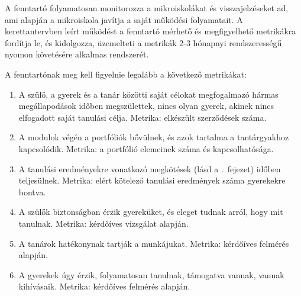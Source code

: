 A fenntartó folyamatosan monitorozza a mikroiskolákat és visszajelzéseket ad,
ami alapján a mikroiskola javítja a saját működési folyamatait. A kerettantervben leírt működést a
fenntartó mérhető és megfigyelhető metrikákra fordítja le, és kidolgozza,
üzemelteti a metrikák 2-3 hónapnyi rendszerességű nyomon követésére alkalmas
rendszerét.

A fenntartónak meg kell figyelnie legalább a következő metrikákat:
\begin{enumerate}
      \item A szülő, a gyerek és a tanár közötti saját célokat megfogalmazó
            hármas
            megállapodások időben megszülettek, nincs olyan gyerek, akinek
            nincs
            elfogadott
            saját tanulási célja. Metrika: elkészült szerződések száma.

      \item A modulok végén a portfóliók bővülnek, és azok tartalma a
            tantárgyakhoz
            kapcsolódik. Metrika: a portfólió elemeinek száma és kapcsolhatósága.
      \item A tanulási eredményekre vonatkozó megkötések
            (lásd a .~fejezet) időben teljesülnek.
            Metrika: elért kötelező tanulási eredmények száma gyerekekre
            bontva.

      \item A szülők biztonságban érzik gyereküket, és eleget tudnak
        arról,\linebreak
        hogy mit tanulnak. Metrika: kérdőíves
        vizsgálat alapján.

      \item A tanárok hatékonynak tartják a munkájukat. Metrika: kérdőíves felmérés
            alapján.

      \item A gyerekek úgy érzik, folyamatosan tanulnak, támogatva vannak,
            vannak
            kihívásaik. Metrika: kérdőíves felmérés alapján.
\end{enumerate}

